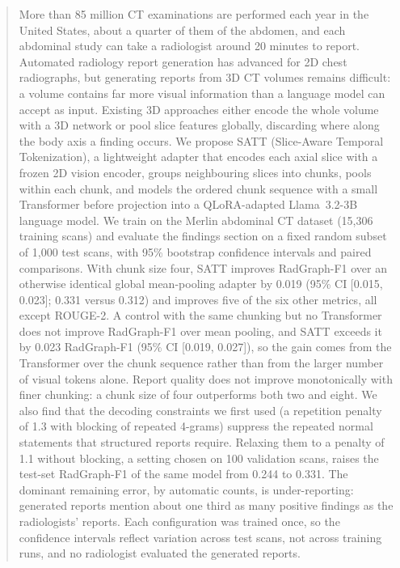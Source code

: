 \documentclass[conference]{IEEEtran}
\begin{document}
\begin{abstract}
More than 85 million CT examinations are performed each year in the United
States, about a quarter of them of the abdomen, and each abdominal study can
take a radiologist around 20 minutes to report. Automated radiology report
generation has advanced for 2D chest radiographs, but generating reports from
3D CT volumes remains difficult: a volume contains far more visual
information than a language model can accept as input. Existing 3D approaches
either encode the whole volume with a 3D network or pool slice features
globally, discarding where along the body axis a finding occurs. We propose
SATT (Slice-Aware Temporal Tokenization), a lightweight adapter that encodes
each axial slice with a frozen 2D vision encoder, groups neighbouring slices
into chunks, pools within each chunk, and models the ordered chunk sequence
with a small Transformer before projection into a QLoRA-adapted
Llama~3.2-3B language model. We train on the Merlin abdominal CT dataset
(15,306 training scans) and evaluate the findings section on a fixed random
subset of 1,000 test scans, with 95\% bootstrap confidence intervals and
paired comparisons. With chunk size four, SATT improves RadGraph-F1 over an
otherwise identical global mean-pooling adapter by 0.019 (95\% CI
[0.015, 0.023]; 0.331 versus 0.312) and improves five of the six other
metrics, all except ROUGE-2. A control with the same chunking but no
Transformer does not improve RadGraph-F1 over mean pooling, and SATT exceeds it by 0.023
RadGraph-F1 (95\% CI [0.019, 0.027]), so the gain comes from the Transformer
over the chunk sequence rather than from the larger number of visual tokens
alone. Report quality does not improve monotonically
with finer chunking: a chunk size of four outperforms both two and eight. We
also find that the decoding constraints we first used (a repetition penalty
of 1.3 with blocking of repeated 4-grams) suppress the repeated normal
statements that structured reports require. Relaxing them to a penalty of 1.1
without blocking, a setting chosen on 100 validation scans, raises the test-set
RadGraph-F1 of the same model from 0.244 to 0.331. The dominant remaining
error, by automatic counts, is under-reporting: generated reports mention
about one third as many positive findings as the radiologists' reports. Each
configuration was trained once, so the confidence intervals reflect variation
across test scans, not across training runs, and no radiologist evaluated the
generated reports.
\end{abstract}
\end{document}
